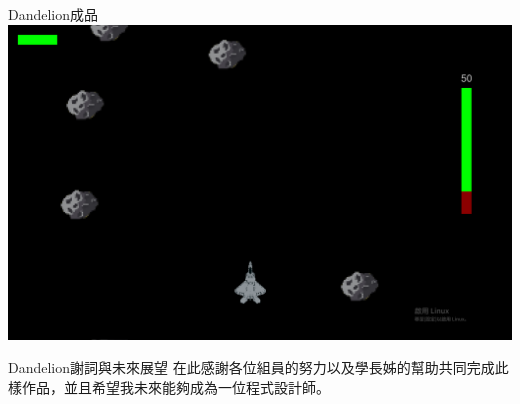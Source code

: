 \documentclass{article}
\begin{document}
\begin{large}
\begin{boxpar}{Dandelion}{成品}
    \includegraphics[width=\linewidth]{src/game.png}
\end{boxpar}
\begin{boxpar}{Dandelion}{謝詞與未來展望}
    在此感謝各位組員的努力以及學長姊的幫助共同完成此樣作品，並且希望我未來能夠成為一位程式設計師。
\end{boxpar}
\end{large}
\end{document}
